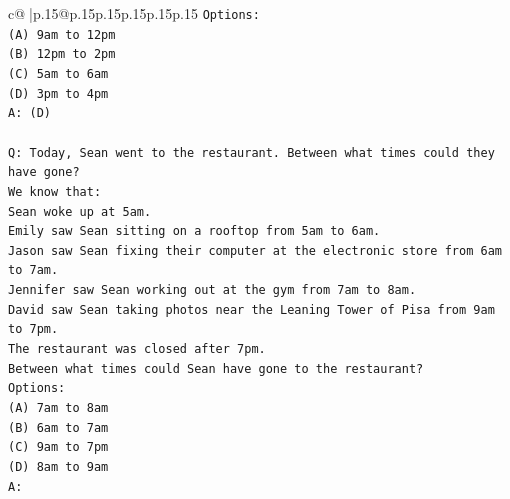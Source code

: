 \documentclass{article}
\begin{document}
{\begin{supertabular}{c@{$\;$}|p{.15\linewidth}@{}p{.15\linewidth}p{.15\linewidth}p{.15\linewidth}p{.15\linewidth}p{.15\linewidth}}
{{{\texttt{Options:} \\
\texttt{(A) 9am to 12pm} \\
\texttt{(B) 12pm to 2pm} \\
\texttt{(C) 5am to 6am} \\
\texttt{(D) 3pm to 4pm} \\
\texttt{A: (D)} \\
\\ 
\texttt{Q: Today, Sean went to the restaurant. Between what times could they have gone?} \\
\texttt{We know that:} \\
\texttt{Sean woke up at 5am.} \\
\texttt{Emily saw Sean sitting on a rooftop from 5am to 6am.} \\
\texttt{Jason saw Sean fixing their computer at the electronic store from 6am to 7am.} \\
\texttt{Jennifer saw Sean working out at the gym from 7am to 8am.} \\
\texttt{David saw Sean taking photos near the Leaning Tower of Pisa from 9am to 7pm.} \\
\texttt{The restaurant was closed after 7pm.} \\
\texttt{Between what times could Sean have gone to the restaurant?} \\
\texttt{Options:} \\
\texttt{(A) 7am to 8am} \\
\texttt{(B) 6am to 7am} \\
\texttt{(C) 9am to 7pm} \\
\texttt{(D) 8am to 9am} \\
\texttt{A:} \\
            }
        }
    }
     \\ \\


\end{supertabular}}
\end{document}
